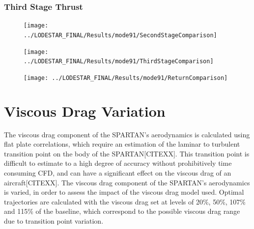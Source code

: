 \subsection{Third Stage Thrust}

\begin{figure}[th]
\centering
\texttt{[image: ../LODESTAR\_FINAL/Results/mode91/SecondStageComparison]}
\caption{}
\label{fig:SecondStageComparison15}
\end{figure}


\begin{figure}[th]
\centering
\texttt{[image: ../LODESTAR\_FINAL/Results/mode91/ThirdStageComparison]}
\caption{}
\label{fig:ThirdStageComparison15}
\end{figure}


\begin{figure}[th]
\centering
\texttt{[image: ../LODESTAR\_FINAL/Results/mode91/ReturnComparison]}
\caption{}
\label{fig:ReturnComparison15}
\end{figure}


\chapter{Viscous Drag Variation}


The viscous drag component of the SPARTAN's aerodynamics is calculated using flat plate correlations, which require an estimation of the laminar to turbulent transition point on the body of the SPARTAN[CITEXX]. This transition point is difficult to estimate to a high degree of accuracy without prohibitively time consuming CFD, and can have a significant effect on the viscous drag of an aircraft[CITEXX].
The viscous drag component of the SPARTAN's aerodynamics is varied, in order to assess the impact of the viscous drag model used. Optimal trajectories are calculated with the viscous drag set at levels of 20\%, 50\%, 107\% and 115\% of the baseline, which correspond to the possible viscous drag range due to transition point variation.

